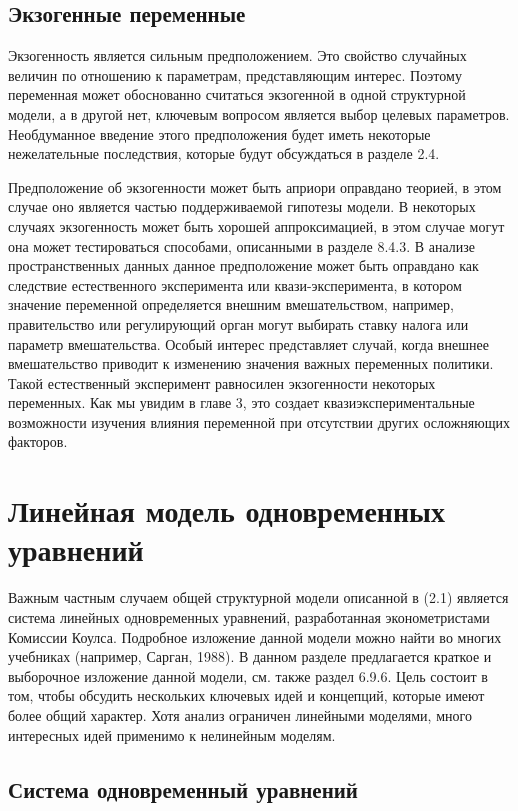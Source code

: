 \subsection{Экзогенные переменные}

	Экзогенность является сильным предположением. Это свойство случайных величин по отношению к параметрам, представляющим интерес. Поэтому переменная может обоснованно считаться экзогенной в одной структурной модели, а в другой нет, ключевым вопросом является выбор целевых параметров. Необдуманное введение этого предположения будет иметь некоторые нежелательные последствия, которые будут обсуждаться в разделе 2.4. 
	
	
	Предположение об экзогенности может быть априори оправдано теорией, в этом случае оно является частью поддерживаемой гипотезы модели. В некоторых случаях экзогенность может быть хорошей аппроксимацией, в этом случае могут она может тестироваться способами, описанными в разделе 8.4.3. В анализе пространственных данных  данное предположение может быть оправдано как следствие естественного эксперимента или квази-эксперимента, в котором значение переменной определяется внешним вмешательством, например, правительство или регулирующий орган могут выбирать ставку налога или параметр вмешательства. Особый интерес представляет случай, когда внешнее вмешательство приводит к изменению значения важных переменных политики. Такой естественный эксперимент равносилен экзогенности некоторых переменных. Как мы увидим в главе 3, это создает квазиэкспериментальные возможности изучения влияния переменной при отсутствии других осложняющих факторов. 


\section{Линейная модель одновременных уравнений}


Важным частным случаем общей структурной модели описанной в (2.1) является система линейных одновременных уравнений, разработанная эконометристами Комиссии Коулса. Подробное изложение данной модели можно найти во многих учебниках (например, Сарган, 1988). В данном разделе предлагается краткое и выборочное изложение данной модели, см. также раздел 6.9.6. Цель состоит в том, чтобы обсудить нескольких ключевых идей и концепций, которые имеют более общий характер. Хотя анализ ограничен линейными моделями, много интересных идей применимо к нелинейным моделям.
  
\subsection{Система одновременный уравнений}

